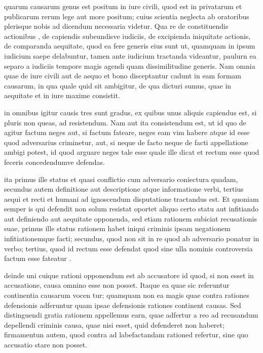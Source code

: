  quarum causarum genus est positum in iure civili, quod est in privatarum et publicarum rerum lege aut more positum; cuius scientia neglecta ab oratoribus plerisque nobis ad dicendum necessaria videtur. Qua re de constituendis actionibus , de capiendis subeundisve iudiciis, de excipienda iniquitate actionis, de comparanda aequitate, quod ea fere generis eius sunt ut, quamquam in ipsum iudicium saepe delabuntur, tamen ante iudicium tractanda videantur, paulurn ea separo a iudiciis tempore magis agendi quam dissimilitudine generis. Nam omnia quae de iure civili aut de aequo et bono disceptantur cadunt in eam formam causarum, in qua quale quid sit ambigitur, de qua dicturi sumus, quae in aequitate et in iure maxime consistit.

 in omnibus igitur causis tres sunt gradus, ex quibus unus aliquis capiendus est, si pluris non queas, ad resistendum. Nam aut ita consistendum est, ut id quo de agitur factum neges aut, si factum fateare, neges eam vim habere atque id esse quod adversarius criminetur, aut, si neque de facto neque de facti appellatione ambigi potest, id quod arguare neges tale esse quale ille dicat et rectum esse quod feceris concedendumve defendas.

 ita primus ille status et quasi conflictio cum adversario coniectura quadam, secundus autem definitione aut descriptione atque informatione verbi, tertius aequi et recti et humani ad ignoscendum disputatione tractandus est. Et quoniam semper is qui defendit non solum resistat oportet aliquo certo statu aut infitiando aut definiendo aut aequitate opponenda, sed etiam rationem subiciat recusationis suae, primus ille status rationem habet iniqui criminis ipsam negationem infitiationemque facti; secundus, quod non sit in re quod ab adversario ponatur in verbo; tertius, quod id rectum esse defendat quod sine ulla nominis controversia factum esse fateatur .

 deinde uni cuique rationi opponendum est ab accusatore id quod, si non esset in accusatione, causa omnino esse non posset. Itaque ea quae sic referuntur continentia causarum vocen tur; quamquam non ea magis quae contra rationes defensionis adferuntur quam ipsae defensionis rationes continent causas. Sed distinguendi gratia rationem appellemus earn, quae adfertur a reo ad recusandum depellendi criminis causa, quae nisi esset, quid defenderet non haberet; firmamentun autem, quod contra ad labefactandam rationed refertur, sine quo accusatio stare non posset.

